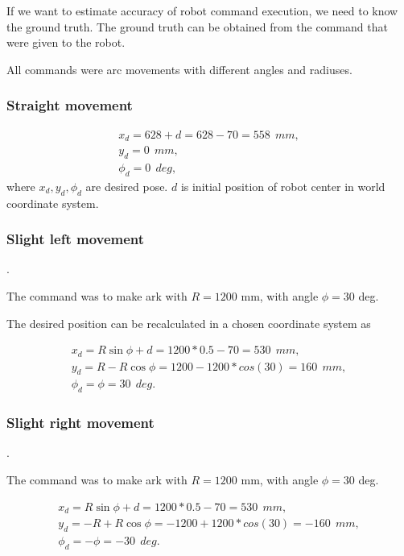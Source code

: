 \documentclass[a4paper, 12pt]{article}
\begin{document}
If we want to estimate accuracy of robot command execution, we need to know the ground truth. The ground truth can be obtained from the command that were given to the robot.

\medskip

All commands were arc movements with different angles and radiuses.

\subsubsection{Straight movement}
$$
\begin{array}{l}
x_d = 628 +d = 628-70 = 558 ~~mm, \\
y_d = 0 ~~mm, \\
\phi_d = 0 ~~deg,
\end{array}
$$
where $x_d,y_d,\phi_d$ are desired pose. $d$ is initial position of robot center in world coordinate system.

\subsubsection{Slight left movement}.

The command was to make ark with $R = 1200$ mm, with angle $\phi = 30$ deg.

\medskip

The desired position can be recalculated in a chosen coordinate system as


$$
\begin{array}{l}
x_d = R \sin \phi + d = 1200*0.5-70 = 530 ~~mm, \\
y_d = R-R \cos \phi = 1200-1200*cos(30) = 160 ~~mm, \\
\phi_d = \phi =30 ~~deg.
\end{array}
$$


\subsubsection{Slight right movement}.

The command was to make ark with $R = 1200$ mm, with angle $\phi = 30$ deg.

\medskip

$$
\begin{array}{l}
x_d = R \sin \phi + d = 1200*0.5-70 = 530 ~~mm, \\
y_d = -R+R \cos \phi = -1200+1200*cos(30) = -160 ~~mm, \\
\phi_d = -\phi = -30 ~~deg.
\end{array}
$$
\end{document}
